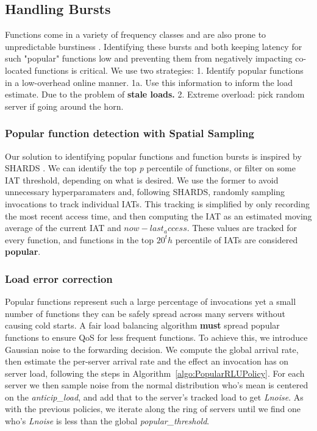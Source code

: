 \subsection{Handling Bursts}

Functions come in a variety of frequency classes and are also prone to unpredictable burstiness \cite{TODO}.
Identifying these bursts and both keeping latency for such "popular" functions low and preventing them from negatively impacting co-located functions is critical.
We use two strategies:
1. Identify popular functions in a low-overhead online manner.
1a. Use this information to inform the load estimate. Due to the problem of \textbf{stale loads.}
2. Extreme overload: pick random server if going around the horn. 

\subsubsection{Popular function detection with Spatial Sampling}

Our solution to identifying popular functions and function bursts is inspired by SHARDS \cite{shards}.
We can identify the top \textit{p} percentile of functions, or filter on some IAT threshold, depending on what is desired. 
We use the former to avoid unnecessary hyperparamaters and, following SHARDS, randomly sampling invocations to track individual IATs.
This tracking is simplified by only recording the most recent access time, and then computing the IAT as an estimated moving average of the current IAT and  $now - last_access$.
These values are tracked for every function, and functions in the top $20^th$ percentile of IATs are considered \textbf{popular}.

\subsubsection{Load error correction}

Popular functions represent such a large percentage of invocations yet a small number of functions they can be safely spread across many servers without causing cold starts.
A fair load balancing algorithm \textbf{must} spread popular functions to ensure QoS for less frequent functions.
To achieve this, we introduce Gaussian noise to the forwarding decision.
We compute the global arrival rate, then estimate the per-server arrival rate and the effect an invocation has on server load, following the steps in Algorithm~\ref{algo:PopularRLUPolicy}.
For each server we then sample noise from the normal distribution who's mean is centered on the \textit{anticip\_load}, and add that to the server's tracked load to get \textit{Lnoise}.
As with the previous policies, we iterate along the ring of servers until we find one who's \textit{Lnoise} is less than the global \textit{popular\_threshold}.


